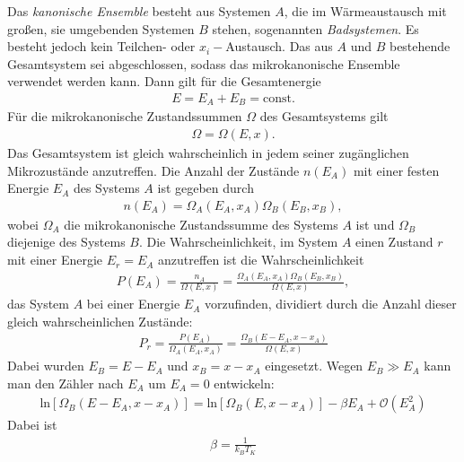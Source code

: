 \documentclass{book}
\renewcommand{\ln}{\text{ln}}
\begin{document}
Das \textit{kanonische Ensemble} besteht aus Systemen $A$, die im Wärmeaustausch mit großen, sie umgebenden Systemen $B$ stehen, sogenannten \textit{Badsystemen}. Es besteht jedoch kein Teilchen- oder $x_i-$Austausch. Das aus $A$ und $B$ bestehende Gesamtsystem sei abgeschlossen, sodass das mikrokanonische Ensemble verwendet werden kann. Dann gilt für die Gesamtenergie
%
\begin{eqnarray}
E = E_A + E_B = \text{const}.
\end{eqnarray}
%
Für die mikrokanonische Zustandssummen $\Omega$ des Gesamtsystems gilt
%
\begin{eqnarray}
\Omega = \Omega\left(E, x\right).
\end{eqnarray}
%
Das Gesamtsystem ist gleich wahrscheinlich in jedem seiner zugänglichen Mikrozustände anzutreffen. Die Anzahl der Zustände $n\left(E_A\right)$ mit einer festen Energie $E_A$ des Systems $A$ ist gegeben durch
%
\begin{eqnarray}
n\left(E_A\right) = \Omega_A\left(E_A, x_A\right)\Omega_B\left(E_B, x_B\right), 
\end{eqnarray}
%
wobei $\Omega_A$ die mikrokanonische Zustandssumme des Systems $A$ ist und $\Omega_B$ diejenige des Systems $B$. Die Wahrscheinlichkeit, im System $A$ einen Zustand $r$ mit einer Energie $E_r = E_A$ anzutreffen ist die Wahrscheinlichkeit
%
\begin{eqnarray}
P\left(E_A\right) = \frac{n_A}{\Omega\left(E, x\right)} = \frac{\Omega_A\left(E_A, x_A\right)\Omega_B\left(E_B, x_B\right)}{\Omega\left(E, x\right)}, 
\end{eqnarray}
%
das System $A$ bei einer Energie $E_A$ vorzufinden, dividiert durch die Anzahl dieser gleich wahrscheinlichen Zustände:
%
\begin{eqnarray}
P_r = \frac{P\left(E_A\right)}{\Omega_A\left(E_A, x_A\right)} = \frac{\Omega_B\left(E - E_A, x - x_A\right)}{\Omega\left(E, x\right)}
\end{eqnarray}
%
Dabei wurden $E_B = E - E_A$ und $x_B = x - x_A$ eingesetzt. Wegen $E_B\gg E_A$ kann man den Zähler nach $E_A$ um $E_A = 0$ entwickeln:
%
\begin{eqnarray}
\ln\left[\Omega_B\left(E - E_A, x - x_A\right)\right] = \ln\left[\Omega_B\left(E, x - x_A\right)\right] - \beta E_A + \mathcal{O}\left(E_A^2\right)
\end{eqnarray}
%
Dabei ist
%
\begin{eqnarray}
\beta = \frac{1}{k_BT_K}
\end{eqnarray}
\end{document}
